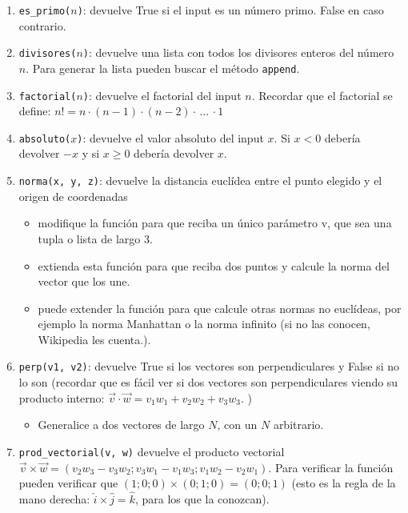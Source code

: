 \documentclass[a4paper]{article}
\begin{document}
\begin{enumerate}

\item \texttt{es\_primo($n$)}: devuelve True si el input es un número primo. False en caso contrario.

\item \texttt{divisores($n$)}: devuelve una lista con todos los divisores enteros del número $n$.
    Para generar la lista pueden buscar el método \texttt{append}.

\item \texttt{factorial($n$)}: devuelve el factorial del input $n$. Recordar que el factorial se define: $n! = n\cdot(n-1)\cdot(n-2)\cdot \,\ldots\, \cdot1$

\item \texttt{absoluto($x$)}: devuelve el valor absoluto del input $x$. Si $x<0$ debería devolver $-x$ y si $x\ge 0$ debería devolver $x$.

\item \texttt{norma(x, y, z)}: devuelve la distancia euclídea entre el punto elegido y el origen de coordenadas

	\begin{itemize}
		\item modifique la función para que reciba un único parámetro v, que sea una tupla o lista de largo 3.
		\item extienda esta función para que reciba dos puntos y calcule la norma del vector que los une.
		\item puede extender la función para que calcule otras normas no euclídeas, por ejemplo la norma Manhattan o la norma infinito (si no las conocen, Wikipedia les cuenta.).
	\end{itemize}

\item \texttt{perp(v1, v2)}: devuelve True si los vectores son perpendiculares y False si no lo son (recordar que es fácil ver si dos vectores son perpendiculares viendo su producto interno: $\vec{v}\cdot \vec{w} = v_1w_1 + v_2w_2 + v_3 w_3$. )
	\begin{itemize}
		\item Generalice a dos vectores de largo $N$, con un $N$ arbitrario.
	\end{itemize}

\item \texttt{prod\_vectorial(v, w)} devuelve el producto vectorial $\vec{v}\times \vec{w} = (v_2 w_3 - v_3 w_2; v_3 w_1 - v_1 w_3; v_1 w_2 - v_2 w_1)$. Para verificar la función pueden verificar que $(1;0;0)\times (0;1;0) = (0;0;1)$ (esto es la regla de la mano derecha: $\hat{i} \times \hat{j} = \hat{k}$, para los que la conozcan).


\end{enumerate}
\end{document}
